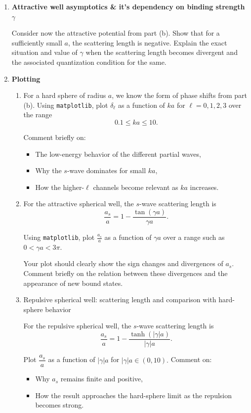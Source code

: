\documentclass[12pt]{article}
\begin{document}
\begin{enumerate}
\begin{enumerate}[label=(\alph*)]
\item \textbf{Attractive well asymptotics \& it's dependency on binding strength $\gamma$}

Consider now the attractive potential from part (b). Show that for a sufficiently small \(a\), the scattering length is negative. Explain the exact situation and value of $\gamma$ when the scattering length becomes divergent and the associated quantization condition for the same.

\item \textbf{Plotting}

\begin{enumerate}

\item For a hard sphere of radius \(a\), we know the form of phase shifts from part (b). Using \texttt{matplotlib}, plot \(\delta_\ell\) as a function of \(ka\) for
\(
\ell=0,1,2,3
\)
over the range
\[
0.1 \le ka \le 10.
\]

Comment briefly on:
\begin{itemize}
\item[a)] The low-energy behavior of the different partial waves,
\item[b)] Why the \(s\)-wave dominates for small \(ka\),
\item[c)]
 How the higher-\(\ell\) channels become relevant as \(ka\) increases.
\end{itemize}

\item For the attractive spherical well, the \(s\)-wave scattering length is
\[
\dfrac{a_s}{a}=1-\frac{\tan(\gamma a)}{\gamma a}.
\]

Using \texttt{matplotlib}, plot
\(
\frac{a_s}{a}
\)
as a function of \(\gamma a\) over a range such as
\(
0<\gamma a<3\pi.
\)

Your plot should clearly show the sign changes and divergences of \(a_s\). Comment briefly on the relation between these divergences and the appearance of new bound states.

\item Repulsive spherical well: scattering length and comparison with hard-sphere behavior

For the repulsive spherical well, the \(s\)-wave scattering length is
\[
\dfrac{a_s}{a}=1-\frac{\tanh(|\gamma|a)}{|\gamma| a}.
\]

Plot
\(
\dfrac{a_s}{a}
\)
as a function of \(|\gamma|a\) for \(|\gamma|a \in (0,10).\) Comment on:
\begin{itemize}
\item[a)] Why \(a_s\) remains finite and positive,
\item[b)] How the result approaches the hard-sphere limit as the repulsion becomes strong.
\end{itemize}

\end{enumerate}

\end{enumerate}
\end{enumerate}
\end{document}
